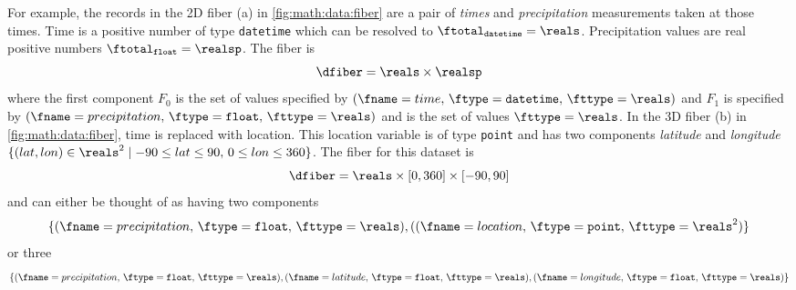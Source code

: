 \documentclass[../main.tex]{subfiles}
\begin{document}
For example, the records in the 2D fiber (a) in \autoref{fig:math:data:fiber} are a pair of \textit{times} and \textit{precipitation} measurements taken at those times. Time is a positive number of type \texttt{datetime} which can be resolved to $\ftotal_{\texttt{datetime}}= \reals$. Precipitation values are real positive numbers $\ftotal_{\texttt{float}} = \realsp$. The fiber is 
\begin{equation*}
    \dfiber =  \reals \times \realsp 
\end{equation*} 
where the first component $F_0$ is the set of values specified by $(\fname=time,\, \ftype=\texttt{datetime},\, \fttype=\reals)$ and $F_1$ is specified by $(\fname=precipitation,\, \ftype=\texttt{float},\, \fttype=\reals)$ and is the set of values $\fttype=\reals$. In the 3D fiber (b) in \autoref{fig:math:data:fiber}, time is replaced with location. This location variable is of type \texttt{point} and has two components \textit{latitude} and \textit{longitude} $\{(lat,lon) \in \reals^{2} \mid  -90\leq lat \leq 90,\, 0 \leq lon \leq 360\}$. The fiber for this dataset is
\begin{equation*}
    \dfiber = \reals \times [0, 360] \times [-90, 90]
\end{equation*} 
and can either be thought of as having two components  
\begin{equation}
    \{(\fname=precipitation,\, \ftype=\texttt{float},\, \fttype=\reals), ((\fname = location,\, \ftype = \texttt{point},\, \fttype=\reals^{2})\}
\end{equation}
 or three
 \begin{equation}
    \{(\fname=precipitation,\, \ftype=\texttt{float},\, \fttype=\reals), (\fname=latitude,\, \ftype=\texttt{float}, \, \fttype=\reals), (\fname=longitude,\, \ftype=\texttt{float},\,\fttype=\reals)\}
 \end{equation}
\end{document}
